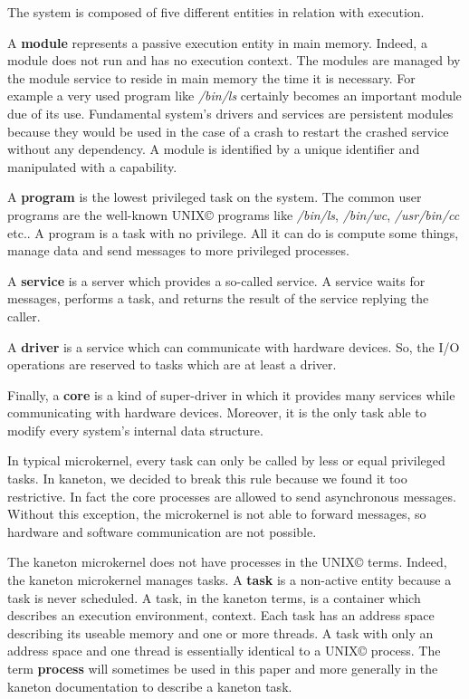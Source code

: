 \begin{multicols}{2}
The system is composed of five different entities in relation with execution.

A \textbf{module} represents a passive execution entity in main memory.
Indeed, a module does not run and has no execution context. The modules are
managed by the module service to reside in main memory the time it is
necessary. For example a very used program like \textit{/bin/ls} certainly
becomes an important module due of its use. Fundamental system's drivers
and services are persistent modules because they would be used in the case
of a crash to restart the crashed service without any dependency.
A module is identified by a unique identifier and manipulated with a
capability.

A \textbf{program} is the lowest privileged task on the system.
The common user programs are the well-known UNIX{\scriptsize \copyright}
programs like \textit{/bin/ls}, \textit{/bin/wc}, \textit{/usr/bin/cc} etc..
A program is a task with no privilege. All it can do is compute some things,
manage data and send messages to more privileged processes.

A \textbf{service} is a server which provides a so-called service. A service
waits for messages, performs a task, and returns the result of the service
replying the caller.

A \textbf{driver} is a service which can communicate with hardware devices.
So, the I/O operations are reserved to tasks which are at least a driver.

Finally, a \textbf{core} is a kind of super-driver in which it provides
many services while communicating with hardware devices. Moreover, it is
the only task able to modify every system's internal data structure.

In typical microkernel, every task can only be called by less or equal
privileged tasks. In kaneton, we decided to break this rule because we found
it too restrictive. In fact the core processes are allowed to send
asynchronous messages. Without this exception, the microkernel is not able
to forward messages, so hardware and software communication are not
possible.

The kaneton microkernel does not have processes in the
UNIX{\scriptsize \copyright} terms. Indeed, the kaneton microkernel manages
tasks. A \textbf{task} is a non-active entity because a task is never
scheduled. A task, in the kaneton terms, is a container which describes
an execution environment, context. Each task has an address space describing
its useable memory and one or more threads. A task with only an address
space and one thread is essentially identical to a UNIX{\scriptsize \copyright}
process. The term \textbf{process} will sometimes be used in this paper and
more generally in the kaneton documentation to describe a kaneton task.


\end{multicols}
